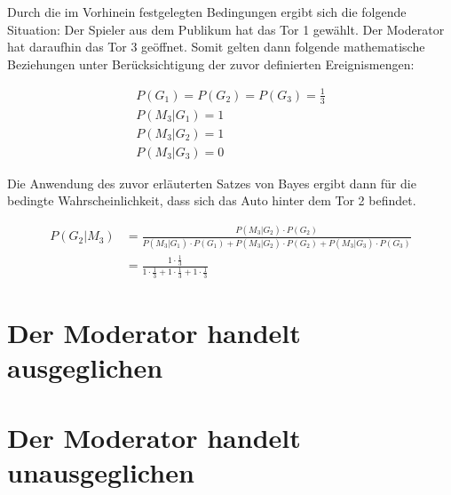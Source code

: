 Durch die im Vorhinein festgelegten Bedingungen ergibt sich die folgende Situation:
Der Spieler aus dem Publikum hat das Tor 1 gewählt. Der Moderator hat daraufhin das Tor 3 geöffnet.
Somit gelten dann folgende mathematische Beziehungen unter Berücksichtigung der zuvor definierten Ereignismengen:

\begin{equation} \label{eq1}
\begin{split}
    P(G_1) = P(G_2) = P(G_3) = \frac{1}{3} \\
    P(M_3 | G_1) = 1 \\
    P(M_3 | G_2) = 1 \\ 
    P(M_3 | G_3) = 0
\end{split}
\end{equation}

Die Anwendung des zuvor erläuterten Satzes von Bayes ergibt dann für die bedingte Wahrscheinlichkeit, dass sich das Auto hinter dem Tor 2 befindet.

\begin{equation}
\begin{split}
    P(G_2 | M_3) & = \frac{P(M_3 | G_2) \cdot P(G_2)}{P(M_3 | G_1) \cdot P(G_1) +
    P(M_3 | G_2) \cdot P(G_2) + P(M_3 | G_3) \cdot P(G_3)} \\
    & = \frac{1 \cdot \frac{1}{3}}{1 \cdot \frac{1}{3} + 1 \cdot \frac{1}{3} + 1 \cdot \frac{1}{3}}
\end{split}
\end{equation}

\section{Der Moderator handelt ausgeglichen}

\section{Der Moderator handelt unausgeglichen}